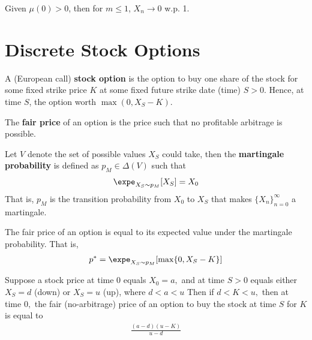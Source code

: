 \documentclass{article}
\begin{document}
	\begin{proposition}
		Given $\mu(0) > 0$, then for $m \leq 1$, $X_n \to 0$ w.p. 1.
	\end{proposition}
	
	\section{Discrete Stock Options}
	\begin{definition}
		A (European call) \textbf{stock option} is the option to buy one share of the stock for some fixed strike price $K$ at some fixed future strike date (time) $S>0$. Hence, at time $S$, the option worth $\max(0, X_S - K)$.
	\end{definition}
	
	\begin{definition}
		The \textbf{fair price} of an option is the price such that no profitable arbitrage is possible.
	\end{definition}
	
	\begin{definition}
		Let $V$ denote the set of possible values $X_S$ could take, then the \textbf{martingale probability} is defined as $p_M \in \Delta(V)$ such that
		\begin{align}
			\expe_{X_S \sim p_M}[X_S] = X_0
		\end{align}
		That is, $p_M$ is the transition probability from $X_0$ to $X_S$ that makes $\{X_n\}_{n=0}^\infty$ a martingale.
	\end{definition}

	\begin{theorem}
		The fair price of an option is equal to its expected value under the martingale probability. That is,
		\begin{align}
			p^* = \expe_{X_S \sim p_M}[\max\{0, X_S - K\}]
		\end{align}
	\end{theorem}
	
	\begin{proposition}
		Suppose a stock price at time 0 equals $X_{0}=a,$ and at time $S>0$ equals either $X_{S}=d$ (down) or $X_{S}=u$ (up), where $d<a<u$ Then if $d<K<u,$ then at time $0,$ the fair (no-arbitrage) price of an option to buy the stock at time $S$ for $K$ is equal to 
		\begin{align}
			\frac{(a-d)(u-K)}{u-d}
		\end{align}
	\end{proposition}
\end{document}
